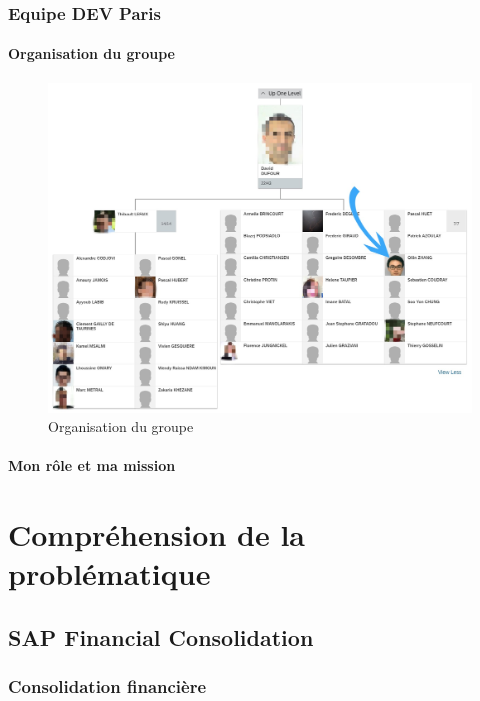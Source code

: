 \documentclass[12pt]{article}
\begin{document}
    \subsubsection{Equipe DEV Paris}
    
        \paragraph{Organisation du groupe}
        \begin{figure}[H]
            \centering
            \includegraphics[width=\textwidth]{organisation_groupe.jpg}
            \caption{Organisation du groupe}
            \label{fig:my_label}
        \end{figure}
        
        \paragraph{Mon rôle et ma mission}
        \newpage

\section{Compréhension de la problématique}

\subsection{SAP Financial Consolidation}
    \subsubsection{Consolidation financière}
    
\end{document}
